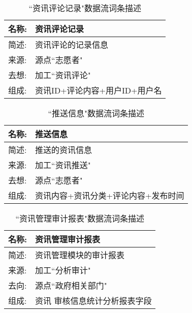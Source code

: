 \begin{table}[H]  
\caption{``资讯评论记录"数据流词条描述}  
\begin{center}  
    \begin{tabular}{l p{11cm}} 
        \hline
        \quad 名称:  &  资讯评论记录 \\
        \hline
        \quad 简述:  & 资讯评论的记录信息 \\
        \hline
        \quad 来源:  & 源点``志愿者" \\
        \hline
        \quad 去想:  & 加工``资讯评论" \\
        \hline
        \quad 组成:  & 资讯ID+评论内容+用户ID+用户名 \\
        \hline
    \end{tabular}
    \label{tab1}
\end{center}
\end{table}

\begin{table}[H]  
\caption{``推送信息"数据流词条描述}  
\begin{center}  
    \begin{tabular}{l p{11cm}} 
        \hline
        \quad 名称:  &  推送信息 \\
        \hline
        \quad 简述:  & 推送的资讯信息 \\
        \hline
        \quad 来源:  & 加工``资讯推送" \\
        \hline
        \quad 去想:  & 源点``志愿者" \\
        \hline
        \quad 组成:  & 资讯内容+资讯分类+评论内容+发布时间 \\
        \hline
    \end{tabular}
    \label{tab1}
\end{center}
\end{table}

\begin{table}[H]  
\caption{``资讯管理审计报表"数据流词条描述}  
\begin{center}  
    \begin{tabular}{l p{11cm}} 
        \hline
        \quad 名称:  &  资讯管理审计报表 \\
        \hline
        \quad 简述:  & 资讯管理模块的审计报表 \\
        \hline
        \quad 来源:  & 加工``分析审计" \\
        \hline
        \quad 去向:  & 源点``政府相关部门" \\
        \hline
        \quad 组成:  & 资讯 审核信息统计分析报表字段\\
        \hline
    \end{tabular}
    \label{tab1}
\end{center}
\end{table}
